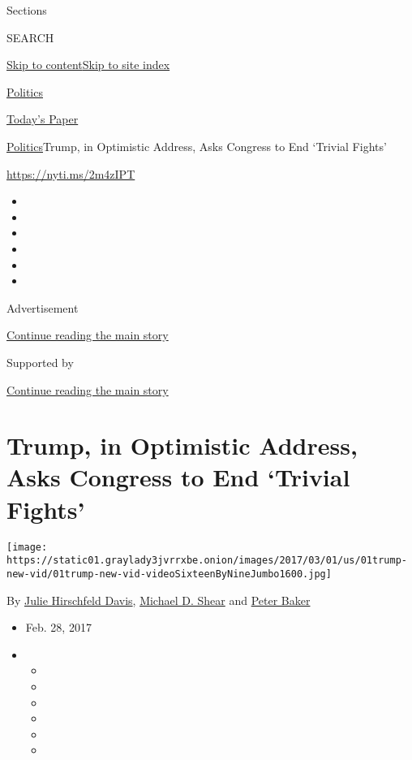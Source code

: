 Sections

SEARCH

\protect\hyperlink{site-content}{Skip to
content}\protect\hyperlink{site-index}{Skip to site index}

\href{https://www.nytimes3xbfgragh.onion/section/politics}{Politics}

\href{https://myaccount.nytimes3xbfgragh.onion/auth/login?response_type=cookie\&client_id=vi}{}

\href{https://www.nytimes3xbfgragh.onion/section/todayspaper}{Today's
Paper}

\href{/section/politics}{Politics}\textbar{}Trump, in Optimistic
Address, Asks Congress to End `Trivial Fights'

\url{https://nyti.ms/2m4zIPT}

\begin{itemize}
\item
\item
\item
\item
\item
\item
\end{itemize}

Advertisement

\protect\hyperlink{after-top}{Continue reading the main story}

Supported by

\protect\hyperlink{after-sponsor}{Continue reading the main story}

\hypertarget{trump-in-optimistic-address-asks-congress-to-end-trivial-fights}{%
\section{Trump, in Optimistic Address, Asks Congress to End `Trivial
Fights'}\label{trump-in-optimistic-address-asks-congress-to-end-trivial-fights}}

\texttt{[image: https://static01.graylady3jvrrxbe.onion/images/2017/03/01/us/01trump-new-vid/01trump-new-vid-videoSixteenByNineJumbo1600.jpg]}

By
\href{https://www.nytimes3xbfgragh.onion/by/julie-hirschfeld-davis}{Julie
Hirschfeld Davis},
\href{http://www.nytimes3xbfgragh.onion/by/michael-d-shear}{Michael D.
Shear} and \href{http://www.nytimes3xbfgragh.onion/by/peter-baker}{Peter
Baker}

\begin{itemize}
\item
  Feb. 28, 2017
\item
  \begin{itemize}
  \item
  \item
  \item
  \item
  \item
  \item
  \end{itemize}
\end{itemize}

